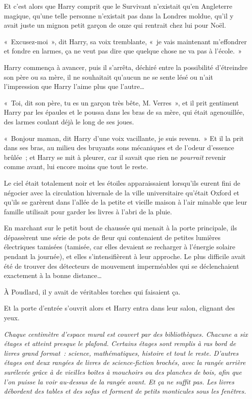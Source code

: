 Et c'est alors que Harry comprit que le Survivant n'existait qu'en Angleterre magique, qu'une telle personne n'existait pas dans la Londres moldue, qu'il y avait juste un mignon petit garçon de onze qui rentrait chez lui pour Noël.

«~Excusez-moi~», dit Harry, sa voix tremblante, «~je vais maintenant m'effondrer et fondre en larmes, ça ne veut pas dire que quelque chose ne va pas à l'école.~»

Harry commença à avancer, puis il s'arrêta, déchiré entre la possibilité d'étreindre son père ou sa mère, il ne souhaitait qu'aucun ne se sente lésé ou n'ait l'impression que Harry l'aime plus que l'autre…

«~Toi, dit son père, tu es un garçon très bête, M. Verres~», et il prit gentiment Harry par les épaules et le poussa dans les bras de sa mère, qui était agenouillée, des larmes coulant déjà le long de ses joues.

«~Bonjour maman, dit Harry d'une voix vacillante, je suis revenu.~» Et il la prit dans ses bras, au milieu des bruyants sons mécaniques et de l'odeur d'essence brûlée~; et Harry se mit à pleurer, car il savait que rien ne \emph{pourrait} revenir comme avant, lui encore moins que tout le reste.

\later

Le ciel était totalement noir et les étoiles apparaissaient lorsqu'ils eurent fini de négocier avec la circulation hivernale de la ville universitaire qu'était Oxford et qu'ils se garèrent dans l'allée de la petite et vieille maison à l'air minable que leur famille utilisait pour garder les livres à l'abri de la pluie.

En marchant sur le petit bout de chaussée qui menait à la porte principale, ils dépassèrent une série de pots de fleur qui contenaient de petites lumières électriques tamisées (tamisée, car elles devaient se recharger à l'énergie solaire pendant la journée), et elles s'intensifièrent à leur approche. Le plus difficile avait été de trouver des détecteurs de mouvement imperméables qui se déclenchaient exactement à la bonne distance…

À Poudlard, il y avait de véritables torches qui faisaient ça.

Et la porte d'entrée s'ouvrit alors et Harry entra dans leur salon, clignant des yeux.

\emph{Chaque centimètre d'espace mural est couvert par des bibliothèques. Chacune a six étages et atteint presque le plafond. Certains étages sont remplis à ras bord de livres grand format~: science, mathématiques, histoire et tout le reste. D'autres étages ont deux rangées de livres de science-fiction brochés, avec la rangée arrière surélevée grâce à de vieilles boîtes à mouchoirs ou des planches de bois, afin que l'on puisse la voir au-dessus de la rangée avant. Et ça ne suffit pas. Les livres débordent des tables et des sofas et forment de petits monticules sous les fenêtres.}


